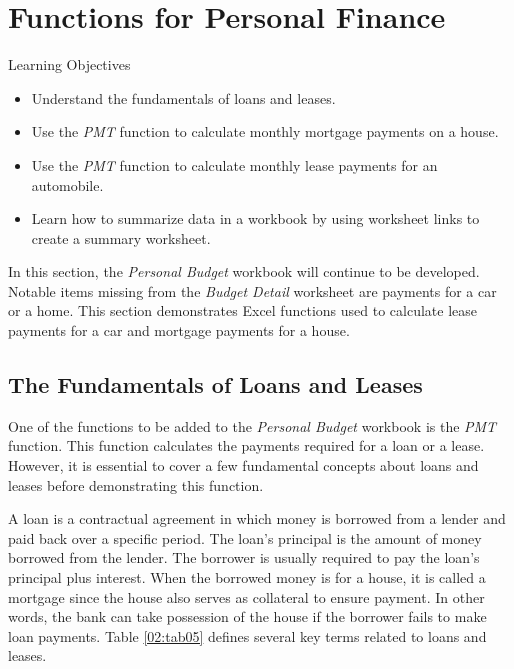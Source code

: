 \section{Functions for Personal Finance}\label{ch02:functions_personal}

\begin{center}
	\begin{objbox}{Learning Objectives}
		\begin{itemize}
			\setlength{\itemsep}{0pt}
			\setlength{\parskip}{0pt}
			\setlength{\parsep}{0pt}
			
			\item Understand the fundamentals of loans and leases.
			\item Use the \textit{PMT} function to calculate monthly mortgage payments on a house.
			\item Use the \textit{PMT} function to calculate monthly lease payments for an automobile.
			\item Learn how to summarize data in a workbook by using worksheet links to create a summary worksheet.

		\end{itemize}
	\end{objbox}
\end{center}

In this section, the \textit{Personal Budget} workbook will continue to be developed. Notable items missing from the \textit{Budget Detail} worksheet are payments for a car or a home. This section demonstrates Excel functions used to calculate lease payments for a car and mortgage payments for a house.

\subsection{The Fundamentals of Loans and Leases}

One of the functions to be added to the \textit{Personal Budget} workbook is the \textit{PMT} function. This function calculates the payments required for a loan or a lease. However, it is essential to cover a few fundamental concepts about loans and leases before demonstrating this function.

A loan is a contractual agreement in which money is borrowed from a lender and paid back over a specific period. The loan's principal is the amount of money borrowed from the lender. The borrower is usually required to pay the loan's principal plus interest. When the borrowed money is for a house, it is called a mortgage since the house also serves as collateral to ensure payment. In other words, the bank can take possession of the house if the borrower fails to make loan payments. Table \ref{02:tab05} defines several key terms related to loans and leases.

